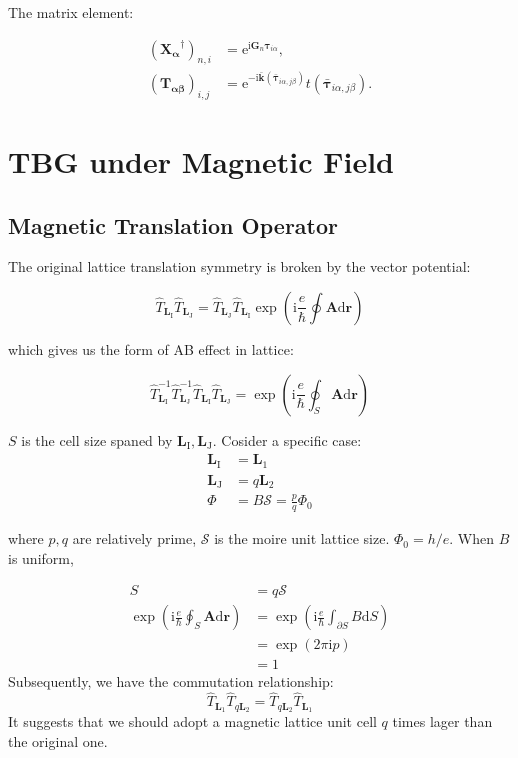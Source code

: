 \documentclass[%
 amsmath,amssymb,
rmp,
]{revtex4-1}
\def \bkbar {\bar{\mathbf{k}}}
\def \bG    {\mathbf{G}}
\def \bA    {\mathbf{A}}
\def \e     {\mathrm{e}}
\def \I     {\mathrm{I}}
\def \J     {\mathrm{J}}
\def \i     {\mathrm{i}}
\def \bL    {\mathbf{L}}
\def \btau  {\bm{\tau}}
\def \br    {\mathbf{r}}
\def \d     {\mathrm{d}}
\begin{document}
The matrix element:

\begin{equation}
\begin{aligned}
(\mathbf{X_\alpha}^\dagger)_{n,i}  &=\e^{\i\bG_n\btau_{i\alpha}},\\
(\mathbf{T_{\alpha \beta}})_{i, j} &= \e^{-\i \bkbar (\bar{\btau}_{i\alpha, j\beta})} 
t(\bar{\btau}_{i\alpha, j\beta}).
\end{aligned}
\end{equation}

\section{TBG under Magnetic Field}

\subsection{Magnetic Translation Operator}

The original lattice translation symmetry is broken by the vector potential:

\begin{equation}
\hat{T}_{\bL_\I} \hat{T}_{\bL_\J} = \hat{T}_{\bL_\J} \hat{T}_{\bL_\I} \exp \left({\i \frac{e}{\hbar} \oint \bA \d \br }\right) 
\end{equation}

which gives us the form of AB effect in lattice:

\begin{equation}
    \hat{T}_{\bL_\I}^{-1} \hat{T}^{-1}_{\bL_\J}\hat{T}_{\bL_\I} \hat{T}_{\bL_\J} =  \exp \left({\i \frac{e}{\hbar} \oint_S \bA \d \br }\right) 
\end{equation}

$S$ is the cell size spaned by $\bL_\I, \bL_\J$. Cosider a specific case:
\begin{equation}
\begin{aligned}
    \bL_\I &= \bL_1 \\
    \bL_\J &= q\bL_2 \\
    \Phi &= B \mathcal{S} = \frac{p}{q} \Phi_0
\end{aligned}
\end{equation}

where $p, q$ are relatively prime, $\mathcal{S}$ is the moire unit lattice size. $\Phi_0 =h/e$. When $B$ is uniform,

\begin{equation}
\begin{aligned}
S &= q \mathcal{S}\\
\exp \left({\i \frac{e}{\hbar} \oint_S \bA \d \br }\right) &= \exp \left(\i \frac{e}{\hbar} \int_{\partial S} B \d S\right) \\
& = \exp(2\pi\i p ) \\
& = 1
\end{aligned}
\end{equation}
Subsequently, we have the commutation relationship:
\begin{equation}
\hat{T}_{\bL_1} \hat{T}_{q\bL_2} = \hat{T}_{q\bL_2}\hat{T}_{\bL_1} 
\end{equation}
It suggests that we should adopt a magnetic lattice unit cell $q$ times lager than the original one.
\end{document}
